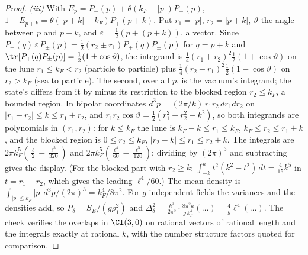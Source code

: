 \begin{proof}
\emph{(iii)} With $E_{p} = P_{-}(p) + \theta(k_{F} - |p|)P_{+}(p)$, $1 - E_{p + k} = \theta(|p + k| - k_{F})P_{+}(p + k)$. Put $r_{1} = |p|$, $r_{2} = |p + k|$, $\vartheta$ the angle between $p$ and $p + k$, and $\varepsilon = \tfrac12(p + (p + k))$, a vector. Since $P_{+}(q)\,\varepsilon\,P_{\pm}(p) = \tfrac12(r_{2} \pm r_{1})P_{+}(q)P_{\pm}(p)$ for $q = p + k$ and $\tr[P_{+}(q)P_{\pm}(p)] = \tfrac12(1 \pm \cos\vartheta)$, the integrand is $\tfrac14(r_{1} + r_{2})^{2}\tfrac12(1 + \cos\vartheta)$ on the lune $r_{1} \le k_{F} < r_{2}$ (particle to particle) plus $\tfrac14(r_{2} - r_{1})^{2}\tfrac12(1 - \cos\vartheta)$ on $r_{2} > k_{F}$ (sea to particle). The second, over all $p$, is the vacuum's integrand; the state's differs from it by minus its restriction to the blocked region $r_{2} \le k_{F}$, a bounded region. In bipolar coordinates $d^{3}p = (2\pi/k)\,r_{1}r_{2}\,dr_{1}dr_{2}$ on $|r_{1} - r_{2}| \le k \le r_{1} + r_{2}$, and $r_{1}r_{2}\cos\vartheta = \tfrac12(r_{1}^{2} + r_{2}^{2} - k^{2})$, so both integrands are polynomials in $(r_{1}, r_{2})$: for $k \le k_{F}$ the lune is $k_{F} - k \le r_{1} \le k_{F}$, $k_{F} \le r_{2} \le r_{1} + k$, and the blocked region is $0 \le r_{2} \le k_{F}$, $|r_{2} - k| \le r_{1} \le r_{2} + k$. The integrals are $2\pi k_{F}^{5}(\tfrac{\ell}{2} - \tfrac{\ell^{5}}{320})$ and $2\pi k_{F}^{5}(\tfrac{\ell^{4}}{60} - \tfrac{\ell^{5}}{120})$; dividing by $(2\pi)^{3}$ and subtracting gives the display. (For the blocked part with $r_{2} \ge k$: $\int_{-k}^{k}t^{2}(k^{2} - t^{2})\,dt = \tfrac{4}{15}k^{5}$ in $t = r_{1} - r_{2}$, which gives the leading $\ell^{4}/60$.) The mean density is $\int_{|p| \le k_{F}}|p|\,d^{3}p/(2\pi)^{3} = k_{F}^{4}/8\pi^{2}$. For $g$ independent fields the variances and the densities add, so $P_{\delta} = S_{E}/(g\bar\rho_{1}^{2})$ and $\Delta^{2}_{\delta} = \tfrac{k^{3}}{2\pi^{2}}\cdot\tfrac{8\pi^{2}k}{g\,k_{F}^{4}}(\dots) = \tfrac{4}{g}\ell^{4}(\dots)$. The check verifies the overlaps in $\Cl(3,0)$ on rational vectors of rational length and the integrals exactly at rational $k$, with the number structure factors quoted for comparison.


\end{proof}
